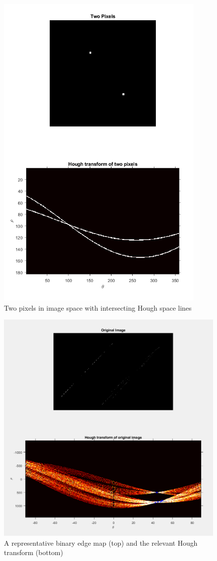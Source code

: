 \documentclass{article}
\begin{document}
	\begin{figure}
		\centering
		\includegraphics[width=4.0in]{HoughBasics2}
		\caption{Two pixels in image space with intersecting Hough space lines}
		\label{HoughBasics2}
	\end{figure}
	
	\begin{figure}
		\centering
		\includegraphics[width=6in]{HoughDemoInput}
		\caption{A representative binary edge map (top) and the relevant Hough transform (bottom)}
		\label{HoughDemoInput}
	\end{figure}
\end{document}
